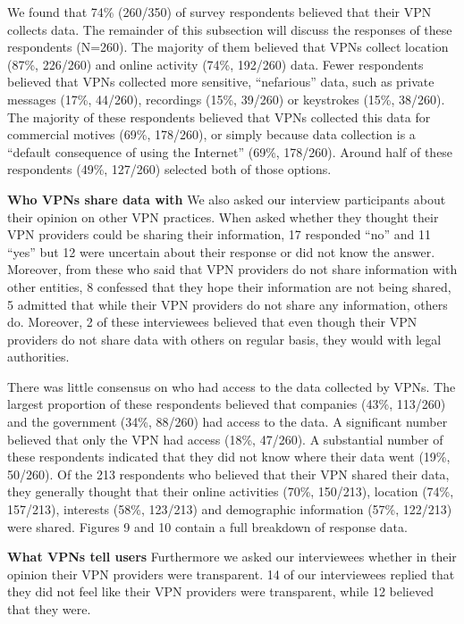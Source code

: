 We found that 74\% (260/350) of survey respondents believed that their VPN
collects data. The remainder of this subsection will discuss the responses of
these respondents (N=260). The majority of them believed that VPNs collect
location (87\%, 226/260) and online activity (74\%, 192/260) data. Fewer
respondents believed that VPNs collected more sensitive, “nefarious” data,
such as private messages (17\%, 44/260), recordings (15\%, 39/260) or
keystrokes (15\%, 38/260). The majority of these respondents believed that
VPNs collected this data for commercial motives (69\%, 178/260), or simply
because data collection is a “default consequence of using the Internet”
(69\%, 178/260). Around half of these respondents (49\%, 127/260) selected
both of those options.

\textbf{Who VPNs share data with} We also asked our interview participants
about their opinion on other VPN practices. When asked whether they thought
their VPN providers could be sharing their information, 17 responded “no” and
11 “yes” but 12 were uncertain about their response or did not know the
answer.  Moreover, from these who said that VPN providers do not share
information with other entities, 8 confessed that they hope their information
are not being shared, 5 admitted that while their VPN providers do not share
any information, others do. Moreover, 2 of these interviewees believed that
even though their VPN providers do not share data with others on regular
basis, they would with legal authorities. 

There was little consensus on who had access to the data collected by VPNs.
The largest proportion of these respondents believed that companies (43\%,
113/260) and the government (34\%, 88/260) had access to the data. A
significant number believed that only the VPN had access (18\%, 47/260). A
substantial number of these respondents indicated that they did not know where
their data went (19\%, 50/260). Of the 213 respondents who believed that their
VPN shared their data, they generally thought that their online activities
(70\%, 150/213), location (74\%, 157/213), interests (58\%, 123/213) and
demographic information (57\%, 122/213) were shared. Figures 9 and 10 contain
a full breakdown of response data.

\textbf{What VPNs tell users} Furthermore we asked our interviewees whether in
their opinion their VPN providers were transparent. 14 of our interviewees
replied that they did not feel like their VPN providers were transparent,
while 12 believed that they were. 

